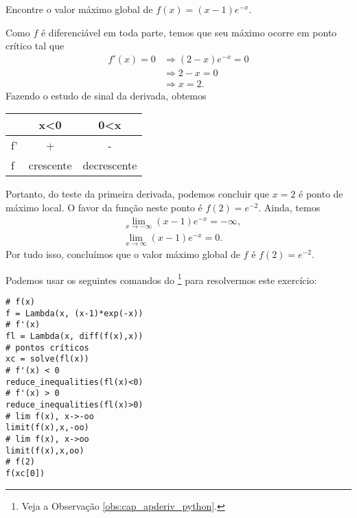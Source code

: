 \begin{exeresol}
  Encontre o valor máximo global de $f(x) = (x-1)e^{-x}$.
\end{exeresol}
\begin{resol}
  Como $f$ é diferenciável em toda parte, temos que seu máximo ocorre em ponto crítico tal que
  \begin{align}
    f'(x) = 0 &\Rightarrow (2-x)e^{-x} = 0 \\
              &\Rightarrow 2-x = 0 \\
              &\Rightarrow x = 2.
  \end{align}
  Fazendo o estudo de sinal da derivada, obtemos
  \begin{center}
    \begin{tabular}[H]{lcc}
         & x<0 & 0<x \\\hline
      f' & + & - \\
      f  & crescente & decrescente \\\hline
    \end{tabular}
  \end{center}
  Portanto, do teste da primeira derivada, podemos concluir que $x=2$ é ponto de máximo local. O favor da função neste ponto é $f(2) = e^{-2}$. Ainda, temos
  \begin{align}
    &\lim_{x\to -\infty} (x-1)e^{-x} = -\infty, \\
    &\lim_{x\to \infty} (x-1)e^{-x} = 0.
  \end{align}
  Por tudo isso, concluímos que o valor máximo global de $f$ é $f(2) = e^{-2}$.

  \ifispython
  Podemos usar os seguintes comandos do \sympy\footnote{Veja a Observação \ref{obs:cap_apderiv_python}.} para resolvermos este exercício:
\begin{verbatim}
# f(x)
f = Lambda(x, (x-1)*exp(-x))
# f'(x)
fl = Lambda(x, diff(f(x),x))
# pontos críticos
xc = solve(fl(x))
# f'(x) < 0
reduce_inequalities(fl(x)<0)
# f'(x) > 0
reduce_inequalities(fl(x)>0)
# lim f(x), x->-oo
limit(f(x),x,-oo)
# lim f(x), x->oo
limit(f(x),x,oo)
# f(2)
f(xc[0])
\end{verbatim}
  \fi
\end{resol}


